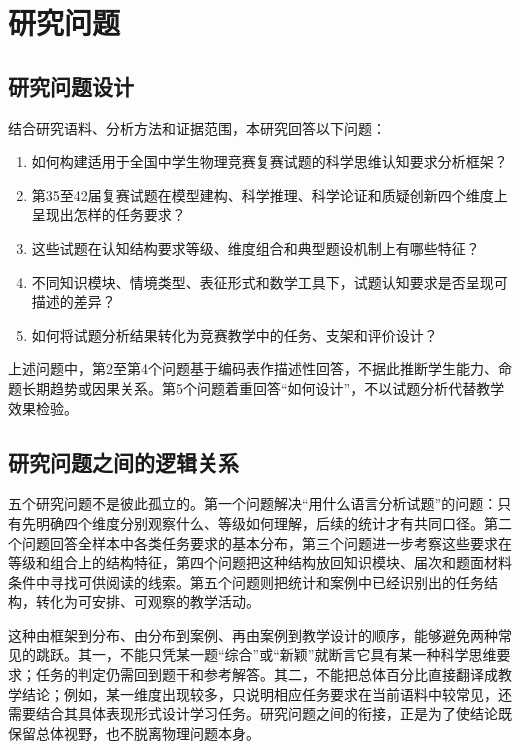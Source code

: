 \documentclass[
  12pt,
  a4paper]{ctexbook}
\providecommand{\tightlist}{%
  \setlength{\itemsep}{0pt}\setlength{\parskip}{0pt}}
\begin{document}
\section{研究问题}\label{ux7814ux7a76ux95eeux9898}

\subsection{研究问题设计}\label{ux7814ux7a76ux95eeux9898ux8bbeux8ba1}

结合研究语料、分析方法和证据范围，本研究回答以下问题：

\begin{enumerate}
\def\labelenumi{\arabic{enumi}.}
\tightlist
\item
  如何构建适用于全国中学生物理竞赛复赛试题的科学思维认知要求分析框架？
\item
  第35至42届复赛试题在模型建构、科学推理、科学论证和质疑创新四个维度上呈现出怎样的任务要求？
\item
  这些试题在认知结构要求等级、维度组合和典型题设机制上有哪些特征？
\item
  不同知识模块、情境类型、表征形式和数学工具下，试题认知要求是否呈现可描述的差异？
\item
  如何将试题分析结果转化为竞赛教学中的任务、支架和评价设计？
\end{enumerate}

上述问题中，第2至第4个问题基于编码表作描述性回答，不据此推断学生能力、命题长期趋势或因果关系。第5个问题着重回答``如何设计''，不以试题分析代替教学效果检验。

\subsection{研究问题之间的逻辑关系}\label{ux7814ux7a76ux95eeux9898ux4e4bux95f4ux7684ux903bux8f91ux5173ux7cfb}

五个研究问题不是彼此孤立的。第一个问题解决``用什么语言分析试题''的问题：只有先明确四个维度分别观察什么、等级如何理解，后续的统计才有共同口径。第二个问题回答全样本中各类任务要求的基本分布，第三个问题进一步考察这些要求在等级和组合上的结构特征，第四个问题把这种结构放回知识模块、届次和题面材料条件中寻找可供阅读的线索。第五个问题则把统计和案例中已经识别出的任务结构，转化为可安排、可观察的教学活动。

这种由框架到分布、由分布到案例、再由案例到教学设计的顺序，能够避免两种常见的跳跃。其一，不能只凭某一题``综合''或``新颖''就断言它具有某一种科学思维要求；任务的判定仍需回到题干和参考解答。其二，不能把总体百分比直接翻译成教学结论；例如，某一维度出现较多，只说明相应任务要求在当前语料中较常见，还需要结合其具体表现形式设计学习任务。研究问题之间的衔接，正是为了使结论既保留总体视野，也不脱离物理问题本身。
\end{document}
